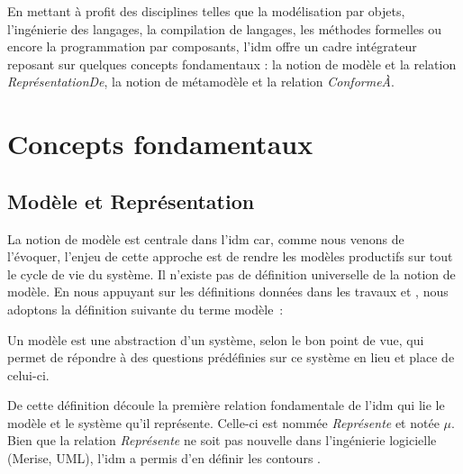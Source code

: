 En mettant à profit des disciplines telles que la modélisation par objets, 
l'ingénierie des langages, la compilation de langages, les méthodes formelles ou encore la programmation par composants, l'\gls{idm} offre un cadre intégrateur reposant 
sur quelques concepts fondamentaux : la notion de modèle et la relation 
\textit{ReprésentationDe}, la notion de métamodèle et la relation 
\textit{ConformeÀ}.

\section{Concepts fondamentaux}
\subsection{Modèle et Représentation}
La notion de modèle est centrale dans l'\gls{idm} car, comme nous venons de l'évoquer, 
l'enjeu de cette approche est de rendre les modèles productifs sur tout le cycle 
de vie du système. Il n'existe pas de définition universelle de la notion de 
modèle. En nous appuyant sur les définitions données dans les travaux 
\cite{minsky1967computation} \cite{bezivin2001towards} et 
\cite{seidewitz2003models}, nous adoptons la définition suivante du terme modèle~:


\begin{definition}
Un modèle est une abstraction d'un système, selon le bon point de vue, qui 
permet de répondre à des questions prédéfinies sur ce système en lieu et place 
de celui-ci.
\end{definition}

De cette définition découle la première relation fondamentale de l'\gls{idm} qui lie 
le modèle et le système qu'il représente. Celle-ci est nommée 
\textit{Représente} et notée $\mu$. Bien que la relation 
\textit{Représente} ne soit pas nouvelle dans l'ingénierie logicielle 
(Merise, UML), l'\gls{idm} a permis d'en définir les contours \cite{atkinson2003model} 
\cite{seidewitz2003models} \cite{bezivin2004search}.


